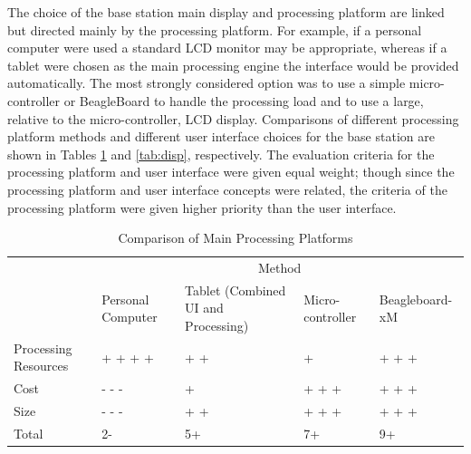 \documentclass[11pt]{article} %
\begin{document}
\quad \newline
The choice of the base station main display and processing platform are linked but directed mainly by the processing platform. For example, if a personal computer were used a standard LCD monitor may be appropriate, whereas if a tablet were chosen as the main processing engine the interface would be provided automatically. The most strongly considered option was to use a simple micro-controller or BeagleBoard to handle the processing load and to use a large, relative to the micro-controller, LCD display. Comparisons of different processing platform methods and different user interface choices for the base station are shown in Tables \ref{tab:proc} and \ref{tab:disp}, respectively. The evaluation criteria for the processing platform and user interface were given equal weight; though since the processing platform and user interface concepts were related, the criteria of the processing platform were given higher priority than the user interface.
\begin{table}[h!]
\caption{Comparison of Main Processing Platforms}
\begin{tabular}{| p{1.5in} | p{.75in} | p{1.5in} | p{0.75in} | p{1.15in} | }
\cline{2-5}
\multicolumn{1}{c}{}&\multicolumn{4}{|c|}{Method} \\
\cline{2-5}
\multicolumn{1}{c|}{}&Personal \newline Computer&Tablet (Combined UI \newline and Processing)&Micro-controller & Beagleboard-xM\\
\hline
Processing Resources&+ + + +&+ +&+&+ + +\\
\hline
Cost &- - -& + &+ + +&+ + +\\
\hline
Size&- - -&+ +&+ + +& + + +\\
\hline
\hline
Total &2-&5+&7+& 9+\\
\hline
\end{tabular}
\label{tab:proc}
\end{table}
\end{document}
